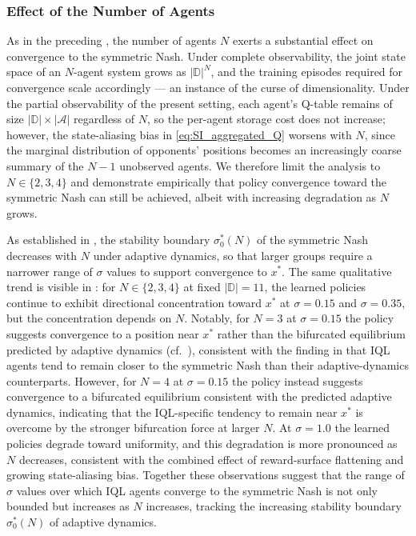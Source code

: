 \documentclass{article}
\begin{document}
            \clearpage
    
            \subsubsection{Effect of the Number of Agents}
                As in the preceding , the number of agents $N$ exerts a substantial effect on convergence to the symmetric Nash. Under complete observability, the joint state space of an $N$-agent system grows as $|\mathbb{D}|^N$, and the training episodes required for convergence scale accordingly --- an instance of the curse of dimensionality. Under the partial observability of the present setting, each agent's Q-table remains of size $|\mathbb{D}| \times |\mathcal{A}|$ regardless of $N$, so the per-agent storage cost does not increase; however, the state-aliasing bias in \cref{eq:SI_aggregated_Q} worsens with $N$, since the marginal distribution of opponents' positions becomes an increasingly coarse summary of the $N-1$ unobserved agents. We therefore limit the analysis to $N \in \{2, 3, 4\}$ and demonstrate empirically that policy convergence toward the symmetric Nash can still be achieved, albeit with increasing degradation as $N$ grows.
    
                As established in , the stability boundary $\sigma_0^*(N)$ of the symmetric Nash decreases with $N$ under adaptive dynamics, so that larger groups require a narrower range of $\sigma$ values to support convergence to $x^*$. The same qualitative trend is visible in : for $N \in \{2, 3, 4\}$ at fixed $|\mathbb{D}|=11$, the learned policies continue to exhibit directional concentration toward $x^*$ at $\sigma = 0.15$ and $\sigma = 0.35$, but the concentration depends on $N$. Notably, for $N = 3$ at $\sigma = 0.15$ the policy suggests convergence to a position near $x^*$ rather than the bifurcated equilibrium predicted by adaptive dynamics (cf.\ ), consistent with the finding in  that IQL agents tend to remain closer to the symmetric Nash than their adaptive-dynamics counterparts. However, for $N=4$ at $\sigma=0.15$ the policy instead suggests convergence to a bifurcated equilibrium consistent with the predicted adaptive dynamics, indicating that the IQL-specific tendency to remain near $x^*$ is overcome by the stronger bifurcation force at larger $N$. At $\sigma = 1.0$ the learned policies degrade toward uniformity, and this degradation is more pronounced as $N$ decreases, consistent with the combined effect of reward-surface flattening and growing state-aliasing bias. Together these observations suggest that the range of $\sigma$ values over which IQL agents converge to the symmetric Nash is not only bounded but increases as $N$ increases, tracking the increasing stability boundary $\sigma_0^*(N)$ of adaptive dynamics.
    
\end{document}
